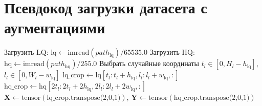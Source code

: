 \documentclass{article}
\begin{document}
\section{Псевдокод загрузки датасета с аугментациями}

\begin{algorithm}[H]
\SetAlgoLined
{}
\BlankLine
Загрузить LQ: $\text{lq} \leftarrow \text{imread}(path_{\text{lq}}) / 65535.0$ 
Загрузить HQ: $\text{hq} \leftarrow \text{imread}(path_{\text{hq}}) / 255.0$ 
Выбрать случайные координаты $t_l \in [0, H_l-h_{\text{lq}}]$, $l_l \in [0, W_l-w_{\text{lq}}]$
$\text{lq\_crop} \leftarrow \text{lq}[t_l:t_l+h_{\text{lq}}, l_l:l_l+w_{\text{lq}}, :]$
$\text{hq\_crop} \leftarrow \text{hq}[2t_l:2t_l+2h_{\text{lq}}, 2l_l:2l_l+2w_{\text{lq}}, :]$
$\mathbf{X} \leftarrow \text{tensor}(\text{lq\_crop.transpose(2,0,1)})$, $\mathbf{Y} \leftarrow \text{tensor}(\text{hq\_crop.transpose(2,0,1)})$

\caption{Получение элемента датасета с синхронными аугментациями}
\end{algorithm}
\end{document}
